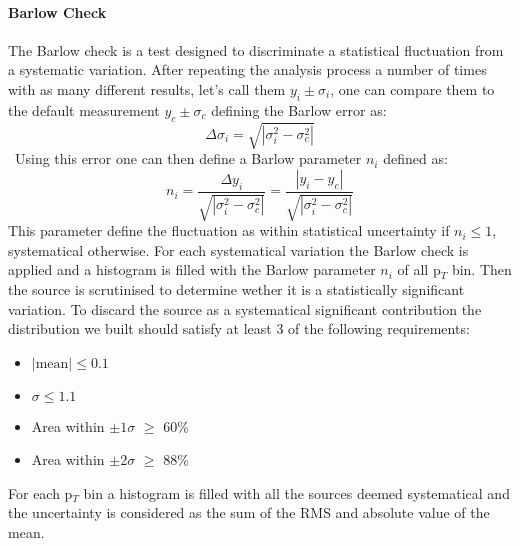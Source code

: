 \paragraph{Barlow Check}
The Barlow check is a test designed to discriminate a statistical fluctuation from a systematic variation. After repeating the analysis process a number of times with as many different results, let's call them $y_i \pm \sigma_i$, one can compare them to the default measurement $y_c \pm \sigma_c$ defining the Barlow error as:
\begin{equation}
\Delta\sigma_i = \sqrt{|\sigma_i^2-\sigma_c^2|}
\end{equation}\
Using this error one can then define a Barlow parameter $n_i$ defined as:
\begin{equation}
n_i = \frac{\Delta y_i}{\sqrt{|\sigma_i^2-\sigma_c^2|}} =  \frac{|y_i - y_c|}{\sqrt{|\sigma_i^2-\sigma_c^2|}}
\end{equation}
This parameter define the fluctuation as within statistical uncertainty if $n_i \leq 1$, systematical otherwise. For each systematical variation the Barlow check is applied and a histogram is filled with the Barlow parameter $n_i$ of all p$_{T}$ bin. Then the source is scrutinised to determine wether it is a statistically significant variation. To discard the source as a systematical significant contribution the distribution we built should satisfy at least 3 of the following requirements:
\begin{itemize}
\item $|\text{mean}| \leq 0.1$
\item $\sigma \leq 1.1$
\item Area within $\pm 1 \sigma$ $\geq$ 60\%
\item Area within $\pm 2 \sigma$ $\geq$ 88\%
\end{itemize}
For each p$_{T}$ bin a histogram is filled with all the sources deemed systematical and the uncertainty is considered as the sum of the RMS and absolute value of the mean.

